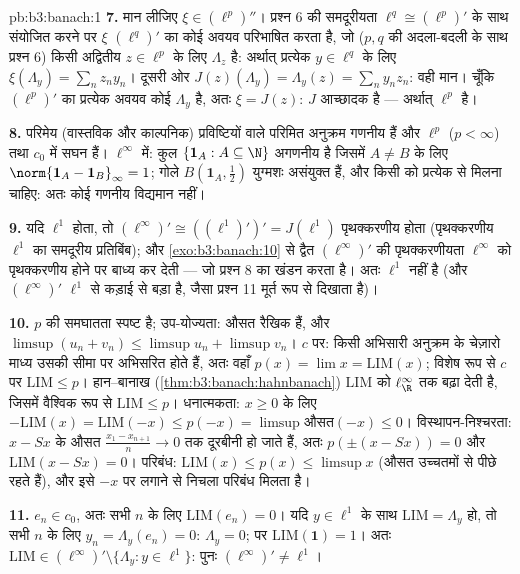\begin{solution}{pb:b3:banach:1}
\textbf{7.} मान लीजिए $\xi \in (\ell^p)''$। प्रश्न 6 की समदूरीयता $\ell^q \cong (\ell^p)'$ के साथ
संयोजित करने पर $\xi$ $(\ell^q)'$ का कोई अवयव परिभाषित करता है, जो ($p, q$
की अदला-बदली के साथ प्रश्न 6) किसी अद्वितीय $z \in \ell^p$ के लिए $\Lambda_z$ है:
अर्थात् प्रत्येक $y \in \ell^q$ के लिए $\xi(\Lambda_y) = \sum_nz_ny_n$। दूसरी ओर $J(z)(\Lambda_y) = \Lambda_y(z) = \sum_ny_nz_n$: वही मान। चूँकि
$(\ell^p)'$ का प्रत्येक अवयव कोई $\Lambda_y$ है, अतः $\xi = J(z)$: $J$ आच्छादक है
--- अर्थात् $\ell^p$  है।

\textbf{8.} परिमेय (वास्तविक और काल्पनिक) प्रविष्टियों वाले परिमित
अनुक्रम गणनीय हैं और $\ell^p$ ($p < \infty$) तथा $c_0$ में सघन हैं। $\ell^\infty$ में:
कुल $\{\mathbf 1_A : A
\subseteq \N\}$ अगणनीय है जिसमें $A \neq B$ के लिए $\norm{\mathbf 1_A -
\mathbf 1_B}_\infty = 1$; गोले $B(\mathbf
1_A, \frac12)$ युग्मशः
असंयुक्त हैं, और किसी  को प्रत्येक से मिलना चाहिए: अतः
कोई गणनीय  विद्यमान नहीं।

\textbf{9.} यदि $\ell^1$  होता, तो $(\ell^\infty)'
\cong ((\ell^1)')' = J(\ell^1)$ पृथक्करणीय होता
(पृथक्करणीय $\ell^1$ का समदूरीय प्रतिबिंब); और \cref{exo:b3:banach:10} से द्वैत $(\ell^\infty)'$ की
पृथक्करणीयता $\ell^\infty$ को पृथक्करणीय होने पर बाध्य कर देती --- जो प्रश्न
8 का खंडन करता है। अतः $\ell^1$  नहीं है (और $(\ell^\infty)'$ $\ell^1$ से
कड़ाई से बड़ा है, जैसा प्रश्न 11 मूर्त रूप से दिखाता है)।

\textbf{10.} $p$ की समघातता स्पष्ट है; उप-योज्यता: औसत रैखिक हैं,
और $\limsup(u_n + v_n) \leq \limsup u_n +
\limsup v_n$। $c$ पर: किसी अभिसारी अनुक्रम के चेज़ारो माध्य उसकी सीमा
पर अभिसरित होते हैं, अतः वहाँ $p(x) = \lim x =
\mathrm{LIM}(x)$; विशेष रूप से $c$ पर $\mathrm{LIM} \leq p$।
हान--बानाख (\cref{thm:b3:banach:hahnbanach}) $\mathrm{LIM}$ को $\ell^\infty_\R$ तक बढ़ा देती है, जिसमें वैश्विक
रूप से $\mathrm{LIM} \leq p$। धनात्मकता: $x \geq 0$ के लिए $-\mathrm{LIM}(x) =
\mathrm{LIM}(-x) \leq p(-x) = \limsup\text{औसत}(-x) \leq 0$। विस्थापन-निश्चरता:
$x - Sx$ के औसत $\frac{x_1 - x_{n+1}}n \to 0$ तक दूरबीनी हो जाते हैं, अतः $p(\pm(x - Sx)) = 0$ और $\mathrm{LIM}(x - Sx) = 0$।
परिबंध: $\mathrm{LIM}(x) \leq p(x)
\leq \limsup x$ (औसत उच्चतमों से पीछे रहते हैं), और इसे $-x$ पर लगाने
से निचला परिबंध मिलता है।

\textbf{11.} $e_n \in c_0$, अतः सभी $n$ के लिए $\mathrm{LIM}(e_n) = 0$। यदि $y \in \ell^1$ के साथ
$\mathrm{LIM} = \Lambda_y$ हो, तो सभी $n$ के लिए $y_n = \Lambda_y(e_n) = 0$: $\Lambda_y = 0$; पर $\mathrm{LIM}(\mathbf 1) = 1$। अतः $\mathrm{LIM} \in
(\ell^\infty)' \setminus \{\Lambda_y : y \in \ell^1\}$:
पुनः $(\ell^\infty)' \neq \ell^1$।


\end{solution}
